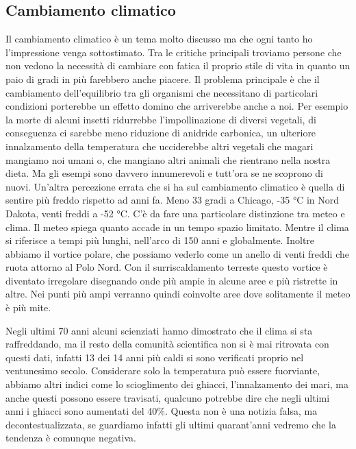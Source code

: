\documentclass[12pt]{book} %
\begin{document}
\bigskip

\subsection{Cambiamento climatico}
Il cambiamento climatico è un tema molto discusso ma che ogni tanto ho l'impressione venga
sottostimato. Tra le critiche principali troviamo persone che non vedono la necessità di cambiare con fatica il proprio
stile di vita in quanto un paio di gradi in più farebbero anche piacere. Il problema principale è che il cambiamento
dell'equilibrio tra gli organismi che necessitano di particolari condizioni porterebbe un effetto
domino che arriverebbe anche a noi. Per esempio la morte di alcuni insetti ridurrebbe
l'impollinazione di diversi vegetali, di conseguenza ci sarebbe meno riduzione di anidride
carbonica, un ulteriore innalzamento della temperatura che ucciderebbe altri vegetali che magari mangiamo noi umani o,
che mangiano altri animali che rientrano nella nostra dieta. Ma gli esempi sono davvero innumerevoli e
tutt'ora se ne scoprono di nuovi. Un'altra percezione errata che si ha sul
cambiamento climatico è quella di sentire più freddo rispetto ad anni fa. Meno 33 gradi a Chicago, -35 °C in Nord
Dakota, venti freddi a -52 °C. C'è da fare una particolare distinzione tra meteo e clima. Il meteo
spiega quanto accade in un tempo spazio limitato. Mentre il clima si riferisce a tempi più lunghi,
nell'arco di 150 anni e globalmente. Inoltre abbiamo il vortice polare, che possiamo vederlo come
un anello di venti freddi che ruota attorno al Polo Nord. Con il surriscaldamento terreste questo vortice è diventato
irregolare disegnando onde più ampie in alcune aree e più ristrette in altre. Nei punti più ampi verranno quindi
coinvolte aree dove solitamente il meteo è più mite. 

Negli ultimi 70 anni alcuni scienziati hanno dimostrato che il clima si sta raffreddando, ma il resto della comunità
scientifica non si è mai ritrovata con questi dati, infatti 13 dei 14 anni più caldi si sono verificati proprio nel
ventunesimo secolo. Considerare solo la temperatura può essere fuorviante, abbiamo altri indici come lo scioglimento
dei ghiacci, l'innalzamento dei mari, ma anche questi possono essere travisati, qualcuno potrebbe
dire che negli ultimi anni i ghiacci sono aumentati del 40\%. Questa non è una notizia falsa, ma decontestualizzata, se
guardiamo infatti gli ultimi quarant'anni vedremo che la tendenza è comunque negativa.


\bigskip
\end{document}
